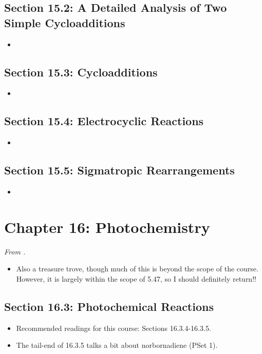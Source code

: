 \documentclass[../notes.tex]{subfiles}
\begin{document}
\subsection*{Section 15.2: A Detailed Analysis of Two Simple Cycloadditions}
\begin{itemize}
    \item 
\end{itemize}


\subsection*{Section 15.3: Cycloadditions}
\begin{itemize}
    \item 
\end{itemize}


\subsection*{Section 15.4: Electrocyclic Reactions}
\begin{itemize}
    \item 
\end{itemize}


\subsection*{Section 15.5: Sigmatropic Rearrangements}
\begin{itemize}
    \item 
\end{itemize}



\section{Chapter 16: Photochemistry}
\emph{From \textcite{bib:Anslyn}.}
\begin{itemize}
    \item Also a treasure trove, though much of this is beyond the scope of the course. However, it is largely within the scope of 5.47, so I should definitely return!!
\end{itemize}


\subsection*{Section 16.3: Photochemical Reactions}
\begin{itemize}
    \item Recommended readings for this course: Sections 16.3.4-16.3.5.
    \item The tail-end of 16.3.5 talks a bit about norbornadiene (PSet 1).
\end{itemize}
\end{document}
